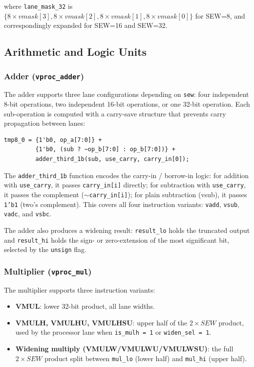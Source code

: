 where \texttt{lane\_mask\_32} is $\{8 \times \mathit{vmask[3]}, 8 \times \mathit{vmask[2]},
8 \times \mathit{vmask[1]}, 8 \times \mathit{vmask[0]}\}$ for SEW=8, and correspondingly
expanded for SEW=16 and SEW=32.

\subsection{Arithmetic and Logic Units}
\label{subsec:alu_units}

\subsubsection{Adder (\texttt{vproc\_adder})}

The adder supports three lane configurations depending on \texttt{sew}: four
independent 8-bit operations, two independent 16-bit operations, or one 32-bit
operation. Each sub-operation is computed with a carry-save structure that prevents
carry propagation between lanes:

\begin{lstlisting}[language=SV,
  caption={Independent 8-bit lane computation in \texttt{vproc\_adder}},
  label={lst:adder_8b}]
tmp8_0 = {1'b0, op_a[7:0]} +
         {1'b0, (sub ? ~op_b[7:0] : op_b[7:0])} +
         adder_third_1b(sub, use_carry, carry_in[0]);
\end{lstlisting}

The \texttt{adder\_third\_1b} function encodes the carry-in / borrow-in logic:
for addition with \texttt{use\_carry}, it passes \texttt{carry\_in[i]} directly;
for subtraction with \texttt{use\_carry}, it passes the complement (\texttt{$\sim$carry\_in[i]});
for plain subtraction (vsub), it passes \texttt{1'b1} (two's complement). This covers
all four instruction variants: \texttt{vadd}, \texttt{vsub}, \texttt{vadc}, and
\texttt{vsbc}.

The adder also produces a widening result: \texttt{result\_lo} holds the truncated
output and \texttt{result\_hi} holds the sign- or zero-extension of the most significant
bit, selected by the \texttt{unsign} flag.

\subsubsection{Multiplier (\texttt{vproc\_mul})}

The multiplier supports three instruction variants:
\begin{itemize}
  \item \textbf{VMUL}: lower 32-bit product, all lane widths.
  \item \textbf{VMULH, VMULHU, VMULHSU}: upper half of the $2\times\mathit{SEW}$ product,
        used by the processor lane when \texttt{is\_mulh = 1} or \texttt{widen\_sel = 1}.
  \item \textbf{Widening multiply (VMULW/VMULWU/VMULWSU)}: the full $2\times\mathit{SEW}$
        product split between \texttt{mul\_lo} (lower half) and \texttt{mul\_hi} (upper half).
\end{itemize}

